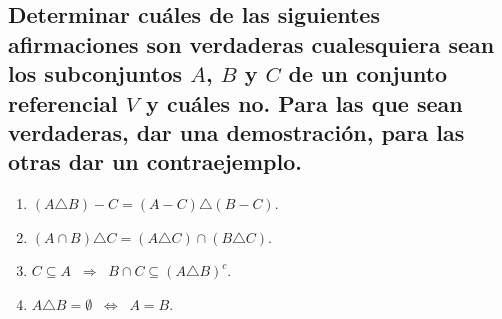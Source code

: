 \documentclass[11pt]{article}
\begin{document}
\subsection{Determinar cuáles de las siguientes afirmaciones son verdaderas 
cualesquiera sean los subconjuntos $A$, $B$ y $C$ de un conjunto referencial $V$ 
y cuáles no. Para las que sean verdaderas, dar una demostración, para las otras dar un contraejemplo. }

\begin{enumerate}[label=\roman*)]
  \item $(A \triangle B) - C = (A - C) \triangle (B - C).$
  \item $(A \cap B) \triangle C = (A \triangle C) \cap (B \triangle C).$
  \item $C \subseteq A \;\;\Rightarrow\;\; B \cap C \subseteq (A \triangle B)^c.$
  \item $A \triangle B = \emptyset \;\;\Leftrightarrow\;\; A = B.$
\end{enumerate}
\end{document}
